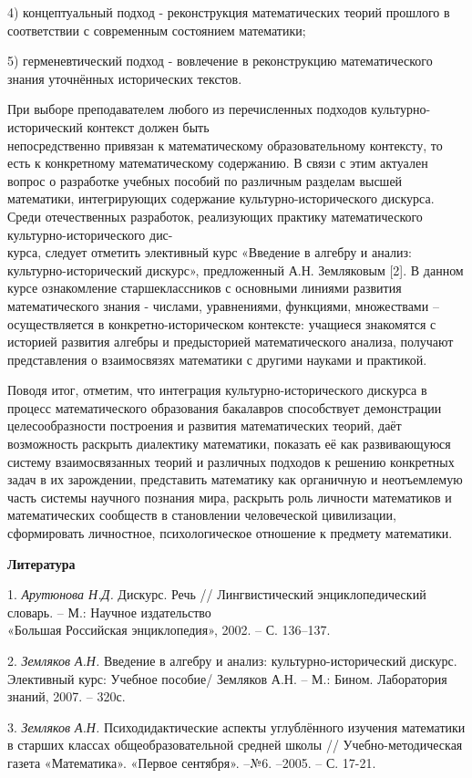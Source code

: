 4) концептуальный подход - реконструкция математических теорий прошлого в соответствии с современным состоянием математики;

5) герменевтический подход - вовлечение в реконструкцию математического знания уточнённых исторических текстов.

При выборе преподавателем любого из перечисленных подходов культурно-исторический контекст должен быть \\не\-посредственно привязан к математическому образовате\-льному контексту, то есть к конкретному математическому содержанию. В связи с этим актуален вопрос о разработке учебных пособий по различным разделам высшей математики, интегрирующих содержание культурно-исторического дискурса. Среди отечественных разработок, реализующих практику математического культурно-исторического дис-\\курса, следует отметить элективный курс «Введение в алгебру и анализ: культурно-исторический дискурс», предложенный А.Н. Земляковым [2]. В данном курсе ознакомление старшеклассников с основными линиями развития математического знания - числами, уравнениями, функциями, множествами – осуществляется в конкретно-историческом контексте: учащиеся знакомятся с историей развития алгебры и предысторией математического анализа, получают представления о взаимосвязях математики с другими науками и практикой.

Поводя итог, отметим, что интеграция культурно-исто\-ри\-ческого дискурса в процесс математического образования бакалавров способствует демонстрации целесообразности построения и развития математических теорий, даёт возможность раскрыть диалектику математики, показать её как развивающуюся систему взаимосвязанных теорий и различных подходов к решению конкретных задач в их зарождении, представить математику как органичную и неотъемлемую часть системы научного познания мира, раскрыть роль личности математиков и математических сообществ в становлении человеческой цивилизации, сформировать личностное, психологическое отношение к предмету математики.



\smallskip \centerline {\bf Литература} \nopagebreak


1. {\it Арутюнова Н.Д.} Дискурс. Речь // Лингвистический энциклопедический словарь. – М.: Научное издательство \\«Большая Российская энциклопедия», 2002. – С. 136–137.

2. {\it Земляков А.Н.} Введение в алгебру и анализ: культур\-но-исторический дискурс. Элективный курс: Учебное пособие/ Земляков А.Н. – М.: Бином. Лаборатория знаний, 2007. – 320с.

3. {\it Земляков А.Н.} Психодидактические аспекты углублённого изучения математики в старших классах общеобразовательной средней школы // Учебно-методическая газета «Математика». «Первое сентября». –№6. –2005. – С. 17-21.
